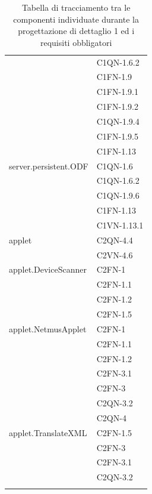 \begin{footnotesize}
\begin{longtable}[!h]{|l|l|}
& C1QN-1.6.2\\
& C1FN-1.9\\
& C1FN-1.9.1\\
& C1FN-1.9.2\\
& C1QN-1.9.4\\
& C1FN-1.9.5\\
& C1FN-1.13\\\hline 
server.persistent.ODF  &  C1QN-1.6\\
& C1QN-1.6.2\\
& C1QN-1.9.6\\
& C1FN-1.13 \\
& C1VN-1.13.1\\\hline 
applet  &  C2QN-4.4\\
& C2VN-4.6 \\\hline
applet.DeviceScanner  &  C2FN-1\\
& C2FN-1.1\\
& C2FN-1.2\\
& C2FN-1.5\\\hline
applet.NetmusApplet  & C2FN-1 \\
& C2FN-1.1 \\
& C2FN-1.2 \\
& C2FN-3.1 \\
& C2FN-3\\
& C2QN-3.2\\
& C2QN-4\\\hline
applet.TranslateXML  &  C2FN-1.5 \\
& C2FN-3\\
& C2FN-3.1\\
& C2QN-3.2\\\hline
\caption{Tabella di tracciamento tra le componenti individuate durante la
progettazione di dettaglio 1 ed i requisiti obbligatori}
\end{longtable}
\end{footnotesize}

